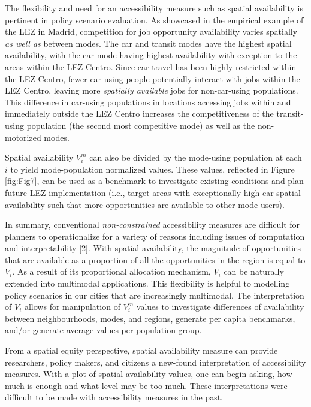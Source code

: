 \documentclass[10pt,letterpaper]{article}
\begin{document}
The flexibility and need for an accessibility measure such as spatial
availability is pertinent in policy scenario evaluation. As showcased in
the empirical example of the LEZ in Madrid, competition for job
opportunity availability varies spatially \emph{as well as} between
modes. The car and transit modes have the highest spatial availability,
with the car-mode having highest availability with exception to the
areas within the LEZ Centro. Since car travel has been highly restricted
within the LEZ Centro, fewer car-using people potentially interact with
jobs within the LEZ Centro, leaving more \emph{spatially available} jobs
for non-car-using populations. This difference in car-using populations
in locations accessing jobs within and immediately outside the LEZ
Centro increases the competitiveness of the transit-using population
(the second most competitive mode) as well as the non-motorized modes.

Spatial availability \(V_i^m\) can also be divided by the mode-using
population at each \(i\) to yield mode-population normalized values.
These values, reflected in Figure \ref{fig:Fig7}, can be used as a
benchmark to investigate existing conditions and plan future LEZ
implementation (i.e., target areas with exceptionally high car spatial
availability such that more opportunities are available to other
mode-users).

In summary, conventional \emph{non-constrained} accessibility measures
are difficult for planners to operationalize for a variety of reasons
including issues of computation and interpretability {[}2{]}. With
spatial availability, the magnitude of opportunities that are available
as a proportion of all the opportunities in the region is equal to
\(V_i\). As a result of its proportional allocation mechanism, \(V_i\)
can be naturally extended into multimodal applications. This flexibility
is helpful to modelling policy scenarios in our cities that are
increasingly multimodal. The interpretation of \(V_i\) allows for
manipulation of \(V_i^m\) values to investigate differences of
availability between neighbourhoods, modes, and regions, generate per
capita benchmarks, and/or generate average values per population-group.

From a spatial equity perspective, spatial availability measure can
provide researchers, policy makers, and citizens a new-found
interpretation of accessibility measures. With a plot of spatial
availability values, one can begin asking, how much is enough and what
level may be too much. These interpretations were difficult to be made
with accessibility measures in the past.
\end{document}
